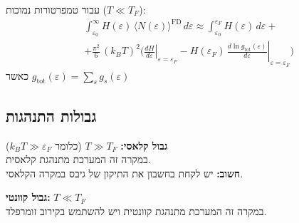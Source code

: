 \begin{cheatformula}
עבור טמפרטורות נמוכות ($T \ll T_F$):
\begin{align*}
&\int_{\varepsilon_0}^{\infty} H(\varepsilon)\,\bigl\langle N(\varepsilon)\bigr\rangle^{\mathrm{FD}}\,d\varepsilon
\approx \int_{\varepsilon_0}^{\varepsilon_F} H(\varepsilon)\,d\varepsilon + \\[6pt]
&+ \frac{\pi^2}{6}\,(k_B T)^2
\Biggl(
\left.\frac{dH}{d\varepsilon}\right|_{\varepsilon=\varepsilon_F}
- H(\varepsilon_F)\,
\left.\frac{d\ln g_{\mathrm{tot}}(\varepsilon)}{d\varepsilon}\right|_{\varepsilon=\varepsilon_F}
\Biggr)
\end{align*}
כאשר $g_{\mathrm{tot}}\left(\varepsilon\right) = \sum_s g_s\left(\varepsilon\right)$
\end{cheatformula}

\subsection{גבולות התנהגות}

\begin{cheatformula}
\textbf{גבול קלאסי:} $T \gg T_F$ (כלומר $k_BT \gg \varepsilon_F$) \\
במקרה זה המערכת מתנהגת קלאסית. \\
\textbf{חשוב:} יש לקחת בחשבון את התיקון של גיבס במקרה הקלאסי.

\textbf{גבול קוונטי:} $T \ll T_F$ \\
במקרה זה המערכת מתנהגת קוונטית ויש להשתמש בקירוב זומרפלד.
\end{cheatformula}